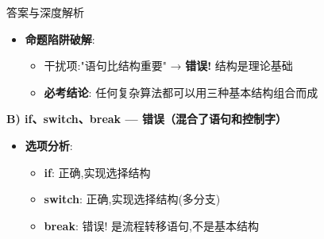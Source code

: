 \documentclass[a4paper,12pt]{article}
\begin{document}
\begin{bluebox}{答案与深度解析}
\begin{itemize}[leftmargin=*, nosep]
		      \textbf{② 选择结构（Selection）}:
		      \begin{itemize}
			      \item \textbf{定义}: 根据条件选择执行路径
			      \item \textbf{C语言实现}: if语句、switch语句、条件运算符(?:)
			      \item \textbf{汇编映射}:
			            \begin{lstlisting}[language=C]
// C代码: if (x > 0) y = 1;
cmp dword [x], 0
jle  .L_else     ; 如果x <= 0,跳到else
mov dword [y], 1 ; y = 1
jmp  .L_end
.L_else:
.L_end:
        \end{lstlisting}
			      \item \textbf{特点}: 包含判断条件,至少两个执行路径
		      \end{itemize}

		      \textbf{③ 循环结构（Iteration/Loop）}:
		      \begin{itemize}
			      \item \textbf{定义}: 重复执行某段代码直到不满足条件
			      \item \textbf{C语言实现}: for、while、do-while
			      \item \textbf{汇编映射}:
			            \begin{lstlisting}[language=C]
// C代码: while (x > 0) { x--; }
.L_loop:
cmp dword [x], 0
jle  .L_end      ; 如果x <= 0,退出循环
dec dword [x]    ; x--
jmp  .L_loop
.L_end:
        \end{lstlisting}
			      \item \textbf{特点}: 包含循环条件和循环体,支持重复执行
		      \end{itemize}

		\item \textbf{命题陷阱破解}:
		      \begin{itemize}
			      \item 干扰项:"语句比结构重要" → \textbf{错误!} 结构是理论基础
			      \item \textbf{必考结论}: 任何复杂算法都可以用三种基本结构组合而成
		      \end{itemize}
	\end{itemize}

	\textbf{B) if、switch、break — 错误（混合了语句和控制字）}
	\begin{itemize}[leftmargin=*, nosep]
		\item \textbf{选项分析}:
		      \begin{itemize}
			      \item \textbf{if}: 正确,实现选择结构
			      \item \textbf{switch}: 正确,实现选择结构(多分支)
			      \item \textbf{break}: 错误! 是流程转移语句,不是基本结构
		      \end{itemize}


\end{itemize}
\end{bluebox}
\end{document}
